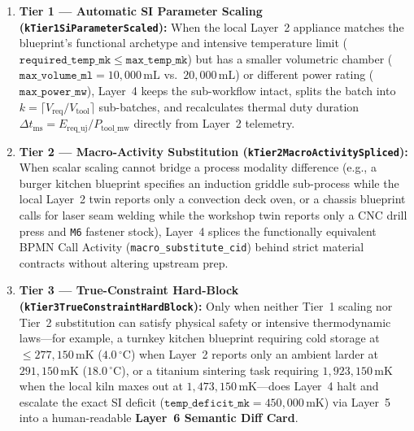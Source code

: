 \begin{enumerate}
    \item \textbf{Tier 1 --- Automatic SI Parameter Scaling (\texttt{kTier1SiParameterScaled}):} When the local Layer~2 appliance matches the blueprint's functional archetype and intensive temperature limit ($\mathtt{required\_temp\_mk} \le \mathtt{max\_temp\_mk}$) but has a smaller volumetric chamber ($\mathtt{max\_volume\_ml} = 10{,}000\,\mathrm{mL}$ vs.\ $20{,}000\,\mathrm{mL}$) or different power rating ($\mathtt{max\_power\_mw}$), Layer~4 keeps the sub-workflow intact, splits the batch into $k = \lceil V_{\mathrm{req}} / V_{\mathrm{tool}} \rceil$ sub-batches, and recalculates thermal duty duration $\Delta t_{\mathrm{ms}} = E_{\mathrm{req\_uj}} / P_{\mathrm{tool\_mw}}$ directly from Layer~2 telemetry.
    \item \textbf{Tier 2 --- Macro-Activity Substitution (\texttt{kTier2MacroActivitySpliced}):} When scalar scaling cannot bridge a process modality difference (e.g., a burger kitchen blueprint specifies an induction griddle sub-process while the local Layer~2 twin reports only a convection deck oven, or a chassis blueprint calls for laser seam welding while the workshop twin reports only a CNC drill press and \texttt{M6} fastener stock), Layer~4 splices the functionally equivalent BPMN Call Activity (\texttt{macro\_substitute\_cid}) behind strict material contracts without altering upstream prep.
    \item \textbf{Tier 3 --- True-Constraint Hard-Block (\texttt{kTier3TrueConstraintHardBlock}):} Only when neither Tier~1 scaling nor Tier~2 substitution can satisfy physical safety or intensive thermodynamic laws---for example, a turnkey kitchen blueprint requiring cold storage at $\le 277{,}150\,\mathrm{mK}$ ($4.0\,^\circ\mathrm{C}$) when Layer~2 reports only an ambient larder at $291{,}150\,\mathrm{mK}$ ($18.0\,^\circ\mathrm{C}$), or a titanium sintering task requiring $1{,}923{,}150\,\mathrm{mK}$ when the local kiln maxes out at $1{,}473{,}150\,\mathrm{mK}$---does Layer~4 halt and escalate the exact SI deficit ($\mathtt{temp\_deficit\_mk} = 450{,}000\,\mathrm{mK}$) via Layer~5 into a human-readable \textbf{Layer~6 Semantic Diff Card}.
\end{enumerate}

